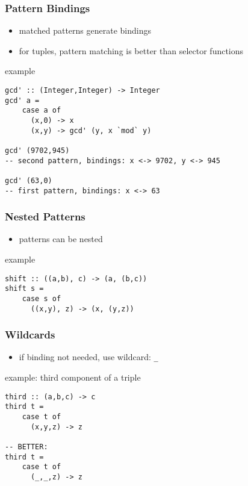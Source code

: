 \documentclass[dvipsnames]{beamer}
\theoremstyle{plain}
\begin{document}
\begin{frame}[fragile]
  \frametitle{Pattern Bindings}

  \begin{itemize}
    \item matched patterns generate bindings
    \item for tuples, pattern matching is better than selector functions
  \end{itemize}

  \begin{exampleblock}{example}
    \begin{lstlisting}
gcd' :: (Integer,Integer) -> Integer
gcd' a =
    case a of
      (x,0) -> x
      (x,y) -> gcd' (y, x `mod` y)

gcd' (9702,945)
-- second pattern, bindings: x <-> 9702, y <-> 945

gcd' (63,0)
-- first pattern, bindings: x <-> 63
    \end{lstlisting}
  \end{exampleblock}
\end{frame}

\begin{frame}[fragile]
  \frametitle{Nested Patterns}

  \begin{itemize}
    \item patterns can be nested
  \end{itemize}

  \begin{exampleblock}{example}
    \begin{lstlisting}
shift :: ((a,b), c) -> (a, (b,c))
shift s =
    case s of
      ((x,y), z) -> (x, (y,z))
    \end{lstlisting}
  \end{exampleblock}
\end{frame}

\begin{frame}[fragile]
  \frametitle{Wildcards}

  \begin{itemize}
    \item if binding not needed, use wildcard: \lstinline{_}
  \end{itemize}

  \begin{exampleblock}{example: third component of a triple}
    \begin{lstlisting}
third :: (a,b,c) -> c
third t =
    case t of
      (x,y,z) -> z

-- BETTER:
third t =
    case t of
      (_,_,z) -> z
    \end{lstlisting}
  \end{exampleblock}
\end{frame}
\end{document}
